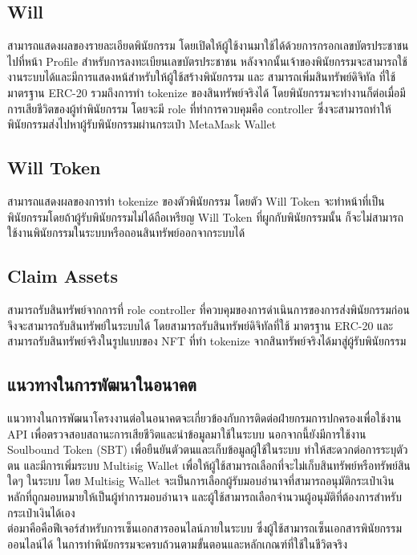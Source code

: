 \documentclass[12pt,oneside,openright,a4paper]{cpe-thai-project}
\begin{document}
\subsection{Will}
\tab สามารถแสดงผลของรายละเอียดพินัยกรรม โดยเปิดให้ผู้ใช้งานมาใช้ได้ด้วยการกรอกเลขบัตรประชาชนไปที่หน้า Profile สำหรับการลงทะเบียนเลขบัตรประชาชน หลังจากนั้นเจ้าของพินัยกรรมจะสามารถใช้งานระบบได้และมีการแสดงหน้สำหรับให้ผู้ใช้สร้างพินัยกรรม และ สามารถเพิ่มสินทรัพย์ดิจิทัล ที่ใช้มาตรฐาน ERC-20 รวมถึงการทำ tokenize ของสินทรัพย์จริงได้ โดยพินัยกรรมจะทำงานก็ต่อเมื่อมีการเสียชีวิตของผู้ทำพินัยกรรม โดยจะมี role ที่ทำการควบคุมคือ controller ซึ่งจะสามารถทำให้พินัยกรรมส่งไปหาผู้รับพินัยกรรมผ่านกระเป๋า MetaMask Wallet\\
\subsection{Will Token}
\tab สามารถแสดงผลของการทำ tokenize ของตัวพินัยกรรม โดยตัว Will Token จะทำหน้าที่เป็นพินัยกรรมโดยถ้าผู้รับพินัยกรรมไม่ได้ถือเหรียญ Will Token ที่ผูกกับพินัยกรรมนั้น ก็จะไม่สามารถใช้งานพินัยกรรมในระบบหรือถอนสินทรัพย์ออกจากระบบได้\\
\subsection{Claim Assets}
\tab สามารถรับสินทรัพย์จากการที่ role controller ที่ควบคุมของการดำเนินการของการส่งพินัยกรรมก่อนจึงจะสามารถรับสินทรัพย์ในระบบได้ โดยสามารถรับสินทรัพย์ดิจิทัลที่ใช้ มาตรฐาน ERC-20 และ สามารถรับสินทรัพย์จริงในรูปแบบของ NFT ที่ทำ tokenize จากสินทรัพย์จริงได้มาสู่ผู้รับพินัยกรรม\\

\subsection{แนวทางในการพัฒนาในอนาคต}
\tab แนวทางในการพัฒนาโครงงานต่อในอนาคตจะเกี่ยวข้องกับการติดต่อฝ่ายกรมการปกครองเพื่อใช้งาน API เพื่อตรวจสอบสถานะการเสียชีวิตและนำข้อมูลมาใช้ในระบบ นอกจากนี้ยังมีการใช้งาน Soulbound Token (SBT) เพื่อยืนยันตัวตนและเก็บข้อมูลผู้ใช้ในระบบ ทำให้สะดวกต่อการระบุตัวตน และมีการเพิ่มระบบ Multisig Wallet เพื่อให้ผู้ใช้สามารถเลือกที่จะไม่เก็บสินทรัพย์หรือทรัพย์สินใดๆ ในระบบ โดย Multisig Wallet จะเป็นการเลือกผู้รับมอบอำนาจที่สามารถอนุมัติกระเป๋าเงินหลักที่ถูกมอบหมายให้เป็นผู้ทำการมอบอำนาจ และผู้ใช้สามารถเลือกจำนวนผู้อนุมัติที่ต้องการสำหรับกระเป๋าเงินได้เอง\\
\tab ต่อมาคือคือฟีเจอร์สำหรับการเซ็นเอกสารออนไลน์ภายในระบบ ซึ่งผู้ใช้สามารถเซ็นเอกสารพินัยกรรมออนไลน์ได้ ในการทำพินัยกรรมจะครบถ้วนตามขั้นตอนและหลักเกณฑ์ที่ใช้ในชีวิตจริง\\
\end{document}
